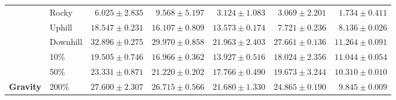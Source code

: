 \begin{table}[t]
\begin{center}
{\begin{tabular}{|llrrrrr|}
            \rowcolor[HTML]{D3D3D3}
            \cellcolor[HTML]{D3D3D3}                                   & Rocky           & \multicolumn{1}{r|}{\cellcolor[HTML]{D3D3D3}$\mathit{6.025\pm2.835}$}  & \multicolumn{1}{r|}{\cellcolor[HTML]{D3D3D3}$\mathbf{9.568\pm5.197}$}  & \multicolumn{1}{r|}{\cellcolor[HTML]{D3D3D3}$3.124\pm1.083$}           & \multicolumn{1}{r|}{\cellcolor[HTML]{D3D3D3}$3.069\pm2.201$}     & $1.734\pm0.411$ \\
            \rowcolor[HTML]{D3D3D3}
            \cellcolor[HTML]{D3D3D3}                                   & Uphill          & \multicolumn{1}{r|}{\cellcolor[HTML]{D3D3D3}$\mathbf{18.547\pm0.231}$} & \multicolumn{1}{r|}{\cellcolor[HTML]{D3D3D3}$\mathit{16.107\pm0.809}$} & \multicolumn{1}{r|}{\cellcolor[HTML]{D3D3D3}$13.573\pm0.174$}          & \multicolumn{1}{r|}{\cellcolor[HTML]{D3D3D3}$7.721\pm0.236$}     & $8.136\pm0.026$ \\
            \rowcolor[HTML]{D3D3D3}
            \multirow{-3}{*}{\cellcolor[HTML]{D3D3D3}\textbf{Terrain}} & Downhill        & \multicolumn{1}{r|}{\cellcolor[HTML]{D3D3D3}$\mathbf{32.896\pm0.275}$} & \multicolumn{1}{r|}{\cellcolor[HTML]{D3D3D3}$\mathit{29.970\pm0.858}$} & \multicolumn{1}{r|}{\cellcolor[HTML]{D3D3D3}$21.963\pm2.403$}          & \multicolumn{1}{r|}{\cellcolor[HTML]{D3D3D3}$27.661\pm0.136$}    & $11.264\pm0.091$ \\
                                                                       & 10\%            & \multicolumn{1}{r|}{$\mathbf{19.505\pm0.746}$}                         & \multicolumn{1}{r|}{$16.966\pm0.362$}                                  & \multicolumn{1}{r|}{$13.927\pm0.516$}                                  & \multicolumn{1}{r|}{$\mathit{18.024\pm2.356}$}                   & $11.044\pm0.054$ \\
                                                                       & 50\%            & \multicolumn{1}{r|}{$\mathbf{23.331\pm0.871}$}                         & \multicolumn{1}{r|}{$\mathit{21.220\pm0.202}$}                         & \multicolumn{1}{r|}{$17.766\pm0.490$}                                  & \multicolumn{1}{r|}{$19.673\pm3.244$}                            & $10.310\pm0.010$ \\
            \multirow{-3}{*}{\textbf{Gravity}}                         & 200\%           & \multicolumn{1}{r|}{$\mathbf{27.600\pm2.307}$}                         & \multicolumn{1}{r|}{$\mathit{26.715\pm0.566}$}                         & \multicolumn{1}{r|}{$21.680\pm1.330$}                                  & \multicolumn{1}{r|}{$24.865\pm0.190$}                            & $9.845\pm0.009$ \\

\end{tabular}}
\end{center}
\end{table}

